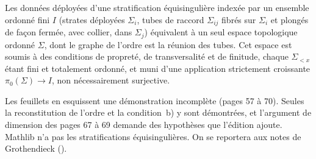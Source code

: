 \begin{encadre}
\begin{theoreme*}\nonverifie
Les données déployées d'une stratification équisingulière indexée par un ensemble ordonné fini $I$ (strates déployées $\Sigma_i$, tubes de raccord $\Sigma_{ij}$ fibrés sur $\Sigma_i$ et plongés de façon fermée, avec collier, dans $\Sigma_j$) équivalent à un seul espace topologique ordonné $\Sigma$, dont le graphe de l'ordre est la réunion des tubes. Cet espace est soumis à des conditions de propreté, de transversalité et de finitude, chaque $\Sigma_{<x}$ étant fini et totalement ordonné, et muni d'une application strictement croissante $\pi_0(\Sigma) \to I$, non nécessairement surjective.
\end{theoreme*}
\end{encadre}
{\small Les feuillets en esquissent une démonstration incomplète (pages 57 à 70). Seules la reconstitution de l'ordre et la condition~b) y sont démontrées, et l'argument de dimension des pages 67 à 69 demande des hypothèses que l'édition ajoute. Mathlib n'a pas les stratifications équisingulières. On se reportera aux notes de Grothendieck ().\par}
